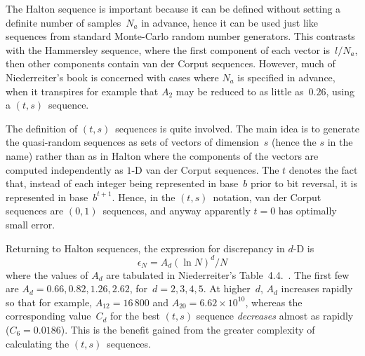 The Halton sequence is important because it can be defined without
setting a definite number of samples~$N_a$ in advance, hence it can be
used just like sequences from standard Monte-Carlo random number generators.
This contrasts with the Hammersley sequence, where the first component of
each vector is~$l/N_a$, then other components contain van der Corput sequences.
However, much of
Niederreiter's book is concerned with cases where $N_a$ is specified in advance,
when it transpires for example that $A_2$ may be reduced to as little as~$0.26$, using a $(t,s)$~sequence.

The definition of $(t,s)$~sequences is quite involved. The main idea is to
generate the quasi-random sequences as sets of vectors of dimension~$s$ 
(hence the $s$ in the name) rather than as in Halton where the components
of the vectors are computed independently as $1$-D van der Corput sequences.
The $t$ denotes the fact that, instead of each integer being represented in base~$b$
prior to bit reversal, it is represented in base~$b^{t+1}$. Hence,
in the $(t,s)$~notation,  van
der Corput sequences are $(0,1)$~sequences, and anyway apparently $t=0$
has optimally small error.

Returning to Halton sequences,
the expression for discrepancy in $d$-D is
\begin{equation}
\epsilon_N = A_d (\ln N)^d/N
\end{equation} 
where the values of $A_d$ are tabulated in Niederreiter's Table~4.4.~\cite[p.96]{niederreiter}.
The first few are $A_d = 0.66, 0.82, 1.26, 2.62$, for~$d=2,3,4,5$. At higher~$d$,
$A_d$ increases rapidly so that for example, $A_{12} = 16\,800$ and
$A_{20}=6.62 \times 10^{10}$, whereas the corresponding value~$C_d$ for the
best $(t,s)$ sequence \emph{decreases} almost as rapidly ($C_6=0.0186$).
This is the benefit  gained from the greater complexity of 
calculating the $(t,s)$~sequences.

